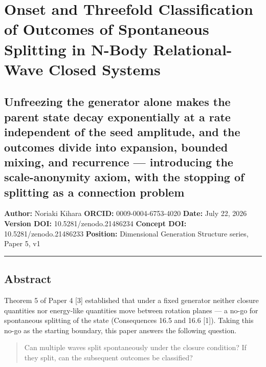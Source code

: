 \documentclass[
  a4paper,
]{article}
\author{}
\date{}
\begin{document}
\section{Onset and Threefold Classification of Outcomes of Spontaneous
Splitting in N-Body Relational-Wave Closed
Systems}\label{onset-and-threefold-classification-of-outcomes-of-spontaneous-splitting-in-n-body-relational-wave-closed-systems}

\subsection{Unfreezing the generator alone makes the parent state decay
exponentially at a rate independent of the seed amplitude, and the
outcomes divide into expansion, bounded mixing, and recurrence ---
introducing the scale-anonymity axiom, with the stopping of splitting as
a connection
problem}\label{unfreezing-the-generator-alone-makes-the-parent-state-decay-exponentially-at-a-rate-independent-of-the-seed-amplitude-and-the-outcomes-divide-into-expansion-bounded-mixing-and-recurrence-introducing-the-scale-anonymity-axiom-with-the-stopping-of-splitting-as-a-connection-problem}

\textbf{Author:} Noriaki Kihara \textbf{ORCID:} 0009-0004-6753-4020
\textbf{Date:} July 22, 2026 \textbf{Version DOI:}
10.5281/zenodo.21486234 \textbf{Concept DOI:} 10.5281/zenodo.21486233
\textbf{Position:} Dimensional Generation Structure series, Paper 5, v1

\begin{center}\rule{0.5\linewidth}{0.5pt}\end{center}

\subsection{Abstract}\label{abstract}

Theorem 5 of Paper 4 {[}3{]} established that under a fixed generator
neither closure quantities nor energy-like quantities move between
rotation planes --- a no-go for spontaneous splitting of the state
(Consequences 16.5 and 16.6 {[}1{]}). Taking this no-go as the starting
boundary, this paper answers the following question.

\begin{quote}
Can multiple waves split spontaneously under the closure condition? If
they split, can the subsequent outcomes be classified?
\end{quote}
\end{document}
